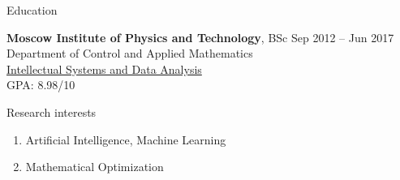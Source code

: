 \documentclass{resume} %
\begin{document}
\begin{rSection}{Education}

{\bf Moscow Institute of Physics and Technology}, BSc \hfill {Sep 2012 -- Jun 2017} \\ 
Department of Control and Applied Mathematics\\\href{http://www.machinelearning.ru/}{Intellectual Systems and Data Analysis}\\
GPA: 8.98/10

\end{rSection}


\begin{rSection}{Research interests}
\begin{enumerate}
\item Artificial Intelligence, Machine Learning
\item Mathematical Optimization
\end{enumerate}
\end{rSection}
\end{document}
